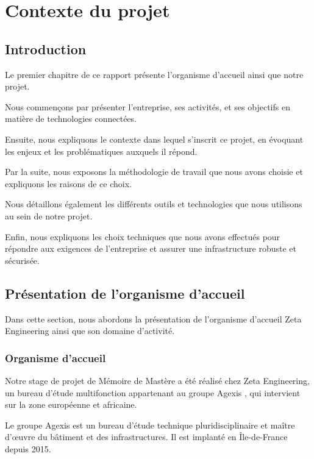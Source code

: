 \chapter{Contexte du projet}

\section{Introduction}
Le premier chapitre de ce rapport présente l'organisme d'accueil ainsi que notre projet.

Nous commençons par présenter l'entreprise, ses activités, et ses objectifs en matière de technologies connectées.

Ensuite, nous expliquons le contexte dans lequel s'inscrit ce projet, en évoquant les enjeux et les problématiques auxquels il répond.

Par la suite, nous exposons la méthodologie de travail que nous avons choisie et expliquons les raisons de ce choix.

Nous détaillons également les différents outils et technologies que nous utilisons au sein de notre projet.

Enfin, nous expliquons  les choix techniques que nous avons effectués pour répondre aux exigences de l'entreprise et assurer une infrastructure robuste et sécurisée.



\section{Présentation de l'organisme d'accueil }

Dans cette section, nous abordons la présentation de l'organisme d'accueil Zeta Engineering ainsi que son domaine d'activité.

\subsection{Organisme d'accueil}

Notre stage de projet de Mémoire de Mastère a été réalisé chez Zeta Engineering, un bureau d'étude multifonction appartenant au groupe Agexis \cite{agexis}, qui intervient sur la zone européenne et africaine. 

Le groupe Agexis est un bureau d'étude technique pluridisciplinaire et maître d'œuvre du bâtiment et des infrastructures. Il est implanté en Île-de-France depuis 2015. 

